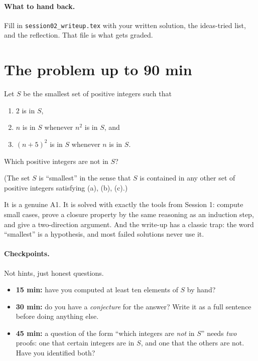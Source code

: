 \documentclass[11pt]{article}
\begin{document}
\paragraph{What to hand back.} Fill in \texttt{session02\_writeup.tex} with your written solution, the ideas-tried list, and the reflection. That file is what gets graded.

\section{The problem \hfill up to 90 min}

\begin{problem}[Putnam 2017, A1]
Let $S$ be the smallest set of positive integers such that
\begin{enumerate}
  \item[(a)] $2$ is in $S$,
  \item[(b)] $n$ is in $S$ whenever $n^2$ is in $S$, and
  \item[(c)] $(n+5)^2$ is in $S$ whenever $n$ is in $S$.
\end{enumerate}
Which positive integers are not in $S$?

\noindent (The set $S$ is ``smallest'' in the sense that $S$ is contained in any other set of positive integers satisfying (a), (b), (c).)
\end{problem}

\begin{why}
It is a genuine A1. It is solved with exactly the tools from Session 1: compute small cases, prove a closure property by the same reasoning as an induction step, and give a two-direction argument. And the write-up has a classic trap: the word ``smallest'' is a hypothesis, and most failed solutions never use it.
\end{why}

\paragraph{Checkpoints.} Not hints, just honest questions.
\begin{itemize}
  \item \textbf{15 min:} have you computed at least ten elements of $S$ by hand?
  \item \textbf{30 min:} do you have a \emph{conjecture} for the answer? Write it as a full sentence before doing anything else.
  \item \textbf{45 min:} a question of the form ``which integers are \emph{not} in $S$'' needs \emph{two} proofs: one that certain integers are in $S$, and one that the others are not. Have you identified both?
\end{itemize}
\end{document}
